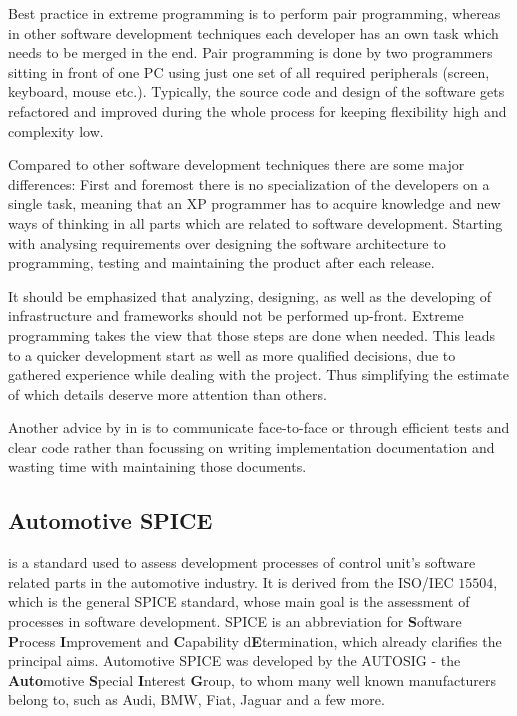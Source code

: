 Best practice in extreme programming is to perform pair programming, whereas in other software development techniques each developer has an 
own task which needs to be merged in the end. Pair programming is done by two programmers sitting in front of one PC using just one set of 
all required peripherals (screen, keyboard, mouse etc.). Typically, the source code and design of the software gets refactored 
and improved during the whole process for keeping flexibility high and complexity low.

Compared to other software development techniques there are some major differences: First and foremost there is no specialization of the 
developers on a single task, meaning that an XP programmer has to acquire knowledge and new ways of thinking in all parts 
which are related to software development. Starting with analysing requirements over designing the software architecture to programming, 
testing and maintaining the product after each release.

It should be emphasized that analyzing, designing, as well as the developing of infrastructure and frameworks should not be performed 
up-front. Extreme programming takes the view that those steps are done when needed. This leads to a quicker development start as well 
as more qualified decisions, due to gathered experience while dealing with the project. Thus simplifying the estimate of which details 
deserve more attention than others.

Another advice by \citeauthor{BECK} in \cite{BECK} is to communicate face-to-face or through efficient tests and 
clear code rather than focussing on writing implementation documentation and wasting time with maintaining those documents.

\subsection{Automotive SPICE}

\cite{AUTOSPICE} is a standard used to assess development processes of control unit's software related parts in the automotive industry. It is derived from the 
ISO/IEC $15504$, which is the general SPICE standard, whose main goal is the assessment of processes in software development. SPICE is an 
abbreviation for \textbf{S}oftware \textbf{P}rocess \textbf{I}mprovement and \textbf{C}apability d\textbf{E}termination, which already 
clarifies the principal aims. Automotive SPICE was developed by the AUTOSIG - the \textbf{Auto}motive \textbf{S}pecial \textbf{I}nterest 
\textbf{G}roup, to whom many well known manufacturers belong to, such as Audi, BMW, Fiat, Jaguar and a few more.


